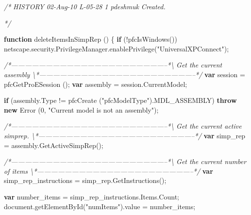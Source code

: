 \documentclass[]{article}
\newenvironment{Shaded}{}{}
\newcommand{\KeywordTok}[1]{\textcolor[rgb]{0.00,0.44,0.13}{\textbf{{#1}}}}
\newcommand{\DecValTok}[1]{\textcolor[rgb]{0.25,0.63,0.44}{{#1}}}
\newcommand{\StringTok}[1]{\textcolor[rgb]{0.25,0.44,0.63}{{#1}}}
\newcommand{\CommentTok}[1]{\textcolor[rgb]{0.38,0.63,0.69}{\textit{{#1}}}}
\newcommand{\OtherTok}[1]{\textcolor[rgb]{0.00,0.44,0.13}{{#1}}}
\newcommand{\FunctionTok}[1]{\textcolor[rgb]{0.02,0.16,0.49}{{#1}}}
\newcommand{\NormalTok}[1]{{#1}}
\begin{document}
\begin{Shaded}
\begin{Highlighting}[]
\CommentTok{/*}
\CommentTok{   HISTORY}
\CommentTok{   }
\CommentTok{02-Aug-10   L-05-28   $$1   pdeshmuk      Created.}

\CommentTok{*/}

\KeywordTok{function} \FunctionTok{deleteItemsInSimpRep} \NormalTok{()}
\NormalTok{\{  }
  \KeywordTok{if} \NormalTok{(!}\FunctionTok{pfcIsWindows}\NormalTok{())}
    \OtherTok{netscape}\NormalTok{.}\OtherTok{security}\NormalTok{.}\OtherTok{PrivilegeManager}\NormalTok{.}\FunctionTok{enablePrivilege}\NormalTok{(}\StringTok{"UniversalXPConnect"}\NormalTok{);}

 \CommentTok{/*--------------------------------------------------------------------*\textbackslash{} }
\CommentTok{   Get the current assembly }
\CommentTok{ \textbackslash{}*--------------------------------------------------------------------*/}  
  \KeywordTok{var} \NormalTok{session = }\FunctionTok{pfcGetProESession} \NormalTok{();}
  \KeywordTok{var} \NormalTok{assembly = }\OtherTok{session}\NormalTok{.}\FunctionTok{CurrentModel}\NormalTok{;}
  
  \KeywordTok{if} \NormalTok{(}\OtherTok{assembly}\NormalTok{.}\FunctionTok{Type} \NormalTok{!= }\FunctionTok{pfcCreate} \NormalTok{(}\StringTok{"pfcModelType"}\NormalTok{).}\FunctionTok{MDL_ASSEMBLY}\NormalTok{)}
    \KeywordTok{throw} \KeywordTok{new} \FunctionTok{Error} \NormalTok{(}\DecValTok{0}\NormalTok{, }\StringTok{"Current model is not an assembly"}\NormalTok{);}
  
 \CommentTok{/*--------------------------------------------------------------------*\textbackslash{} }
\CommentTok{   Get the current active simprep.}
\CommentTok{ \textbackslash{}*--------------------------------------------------------------------*/}  
  \KeywordTok{var} \NormalTok{simp_rep = }\OtherTok{assembly}\NormalTok{.}\FunctionTok{GetActiveSimpRep}\NormalTok{();}
 
 \CommentTok{/*--------------------------------------------------------------------*\textbackslash{} }
\CommentTok{   Get the current number of items}
\CommentTok{ \textbackslash{}*--------------------------------------------------------------------*/}  
  \KeywordTok{var} \NormalTok{simp_rep_instructions = }\OtherTok{simp_rep}\NormalTok{.}\FunctionTok{GetInstructions}\NormalTok{();}
    
  \KeywordTok{var} \NormalTok{number_items = }\OtherTok{simp_rep_instructions}\NormalTok{.}\OtherTok{Items}\NormalTok{.}\FunctionTok{Count}\NormalTok{;}
  \OtherTok{document}\NormalTok{.}\FunctionTok{getElementById}\NormalTok{(}\StringTok{"numItems"}\NormalTok{).}\FunctionTok{value} \NormalTok{= number_items;}


\end{Highlighting}
\end{Shaded}
\end{document}

